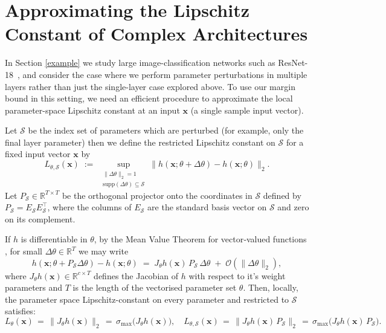 \documentclass{article}
\theoremstyle{plain}
\theoremstyle{definition}
\theoremstyle{remark}
\begin{document}
\section{Approximating the Lipschitz Constant of Complex Architectures}
\label{ap_lip}
In Section \ref{example} we study large image-classification networks such as ResNet-18~\cite{he_deep_2016}, and consider the case where we perform parameter perturbations in multiple layers rather than just the single-layer case explored above. To use our margin bound in this setting, we need an efficient procedure to approximate the local parameter-space
Lipschitz constant at an input $\textbf{x}$ (a single sample input vector). 


Let $\mathcal{S}$ be the index set of parameters which are perturbed (for example, only the final layer parameter) then we define the restricted Lipschitz constant on $\mathcal{S}$  for a fixed input vector $\textbf{x}$ by \cite{nesterov_efficiency_2012}
\[
L_{\theta,\mathcal S}(\textbf{x})\;:=\;\sup_{\substack{\|\Delta\theta\|_2=1\\ \mathrm{supp}(\Delta\theta)\subseteq\mathcal S}}
\big\|h(\textbf{x};\theta+\Delta\theta)-h(\textbf{x};\theta)\big\|_2.
\]
 Let $P_{\mathcal S}\in\mathbb{R}^{T\times T}$ be the orthogonal projector onto the coordinates in $\mathcal S$ defined by $P_{\mathcal S}=E_{\mathcal S}E_{\mathcal S}^\top$, where the columns of $E_\mathcal{S}$ are the standard basis vector on 
 $\mathcal S$ and zero on its complement.
 
 If \(h\) is differentiable in \(\theta\),  by the Mean Value Theorem for vector‐valued functions \cite{rudin_principles_1976},  for small $\Delta\theta\in\mathbb{R}^T$ we may write
 \[
h(\mathbf{x};\theta+P_{\mathcal S}\Delta\theta)-h(\mathbf{x};\theta)
\;=\; J_\theta h(\mathbf{x})\,P_{\mathcal S}\,\Delta\theta \;+\; \mathcal{O}(\|\Delta\theta\|_2),
\]
where
$J_\theta h(\mathbf{x})\in\mathbb{R}^{c\times T}$ defines the Jacobian of $h$ with respect to it's weight parameters and $T$ is the length of the vectorised parameter set $\theta$. Then, locally, the parameter space Lipschitz-constant on every parameter and restricted to $\mathcal{S}$ satisfies:
\[
L_\theta(\mathbf{x})\,=\,\|J_\theta h(\mathbf{x})\|_2\,=\,\sigma_{\max}\big(J_\theta h(\mathbf{x})\big),
\quad
L_{\theta,\mathcal S}(\mathbf{x})\,=\,\|J_\theta h(\mathbf{x})\,P_{\mathcal S}\|_2\,=\,\sigma_{\max}\big(J_\theta h(\mathbf{x})\,P_{\mathcal S}\big).
\]
\end{document}

